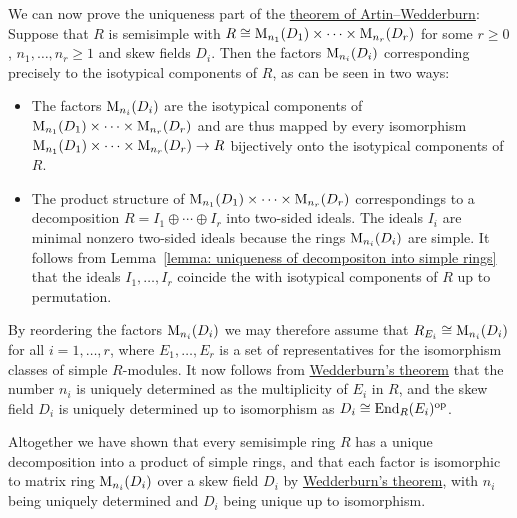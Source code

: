 \begin{fluff}
  We can now prove the uniqueness part of the \hyperref[theorem: artin wedderburn theorem]{theorem of Artin--Wedderburn}:
  Suppose that $R$ is semisimple with $R \cong \operatorname{M}_{n_1}(D_1) \times \dotsb \times \operatorname{M}_{n_r}(D_r)$ for some $r \geq 0$, $n_1, \dotsc, n_r \geq 1$ and skew fields $D_i$.
  Then the factors $\operatorname{M}_{n_i}(D_i)$ corresponding precisely to the isotypical components of $R$, as can be seen in two ways:
  \begin{itemize}
    \item
      The factors $\operatorname{M}_{n_i}(D_i)$ are the isotypical components of $\operatorname{M}_{n_1}(D_1) \times \dotsb \times \operatorname{M}_{n_r}(D_r)$ and are thus mapped by every isomorphism $\operatorname{M}_{n_1}(D_1) \times \dotsb \times \operatorname{M}_{n_r}(D_r) \to R$ bijectively onto the isotypical components of $R$.
    \item
      The product structure of $\operatorname{M}_{n_1}(D_1) \times \dotsb \times \operatorname{M}_{n_r}(D_r)$ correspondings to a decomposition $R = I_1 \oplus \dotsb \oplus I_r$ into two-sided ideals.
      The ideals $I_i$ are minimal nonzero two-sided ideals because the rings $\operatorname{M}_{n_i}(D_i)$ are simple.
      It follows from Lemma~\ref{lemma: uniqueness of decompositon into simple rings} that the ideals $I_1, \dotsc, I_r$ coincide the with isotypical components of $R$ up to permutation.
  \end{itemize}
  By reordering the factors $\operatorname{M}_{n_i}(D_i)$ we may therefore assume that $R_{E_i} \cong \operatorname{M}_{n_i}(D_i)$ for all $i = 1, \dotsc, r$, where $E_1, \dotsc, E_r$ is a set of representatives for the isomorphism classes of simple $R$-modules.
  It now follows from \hyperref[theorem: wedderburns theorem]{Wedderburn’s theorem} that the number $n_i$ is uniquely determined as the multiplicity of $E_i$ in $R$, and the skew field $D_i$ is uniquely determined up to isomorphism as $D_i \cong \operatorname{End}_R(E_i)^{\operatorname{op}}$.
\end{fluff}


\begin{fluff}
  Altogether we have shown that every semisimple ring $R$ has a unique decomposition into a product of simple rings, and that each factor is isomorphic to matrix ring $\operatorname{M}_{n_i}(D_i)$ over a skew field $D_i$ by \hyperref[theorem: wedderburns theorem]{Wedderburn’s theorem}, with $n_i$ being uniquely determined and $D_i$ being unique up to isomorphism.
\end{fluff}


